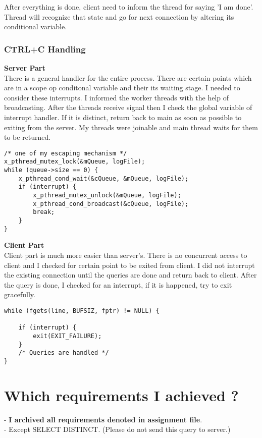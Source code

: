 \documentclass{article}
\begin{document}
After everything is done, client need to inform the thread for saying 'I am done'. Thread will recognize that state and go for next connection by altering its conditional variable.\\
\subsubsection{CTRL+C Handling}
\textbf{Server Part}\\
There is a general handler for the entire process. There are certain points which are in a scope op conditonal variable and their its waiting stage. I needed to consider these interrupts. I informed the worker threads with the help of broadcasting. After the threads receive signal then I check the global variable of interrupt handler. If it is distinct, return back to main as soon as possible to exiting from the server. My threads were joinable and main thread waits for them to be returned.
\begin{lstlisting}[style=CStyle]
/* one of my escaping mechanism */
x_pthread_mutex_lock(&mQueue, logFile);
while (queue->size == 0) {
    x_pthread_cond_wait(&cQueue, &mQueue, logFile);
    if (interrupt) {
        x_pthread_mutex_unlock(&mQueue, logFile);
        x_pthread_cond_broadcast(&cQueue, logFile);
        break;
    }
}
\end{lstlisting}
\textbf{Client Part}\\
Client part is much more easier than server's. There is no concurrent access to client and I checked for certain point to be exited from client. I did not interrupt the existing connection until the queries are done and return back to client. After the query is done, I checked for an interrupt, if it is happened, try to exit gracefully.
\begin{lstlisting}[style=CStyle]
while (fgets(line, BUFSIZ, fptr) != NULL) {

    if (interrupt) {
        exit(EXIT_FAILURE);
    }
    /* Queries are handled */   
}
\end{lstlisting}

\section{Which requirements I achieved ?}
- \textbf{I archived all requirements denoted in assignment file}.\\
- Except SELECT DISTINCT. (Please do not send this query to server.)

\begin{figure}[H]
\end{figure}                    
\end{document}
